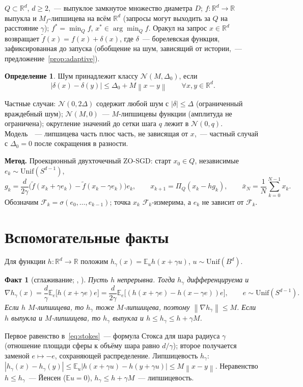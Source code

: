 \documentclass[12pt,a4paper]{article}
\theoremstyle{plain}
\newtheorem{fact}{Факт}
\theoremstyle{definition}
\newtheorem{definition}{Определение}
\theoremstyle{remark}
\newcommand{\E}{\mathbb{E}}
\newcommand{\R}{\mathbb{R}}
\newcommand{\norm}[1]{\left\lVert #1\right\rVert}
\newcommand{\abs}[1]{\left\lvert #1\right\rvert}
\newcommand{\F}{\mathcal F}
\begin{document}
$Q\subset\R^d$, $d\ge2$,~--- выпуклое замкнутое множество диаметра $D$; $f:\R^d\to\R$ выпукла и $M_f$-липшицева на всём $\R^d$ (запросы могут выходить за $Q$ на расстояние $\gamma$); $f^*=\min_Qf$, $x^*\in\arg\min_Qf$. Оракул на запрос $x\in\R^d$ возвращает $\tilde f(x)=f(x)+\delta(x)$, где $\delta$~--- борелевская функция, зафиксированная до запуска (обобщение на шум, зависящий от истории,~--- предложение~\ref{prop:adaptive}).

\begin{definition}
Шум принадлежит классу $\mathcal N(M,\Delta_0)$, если
\begin{equation}\label{eq:class}
  \abs{\delta(x)-\delta(y)}\le\Delta_0+M\norm{x-y}\qquad\forall x,y\in\R^d .
\end{equation}
\end{definition}
Частные случаи: $\mathcal N(0,2\Delta)$ содержит любой шум с $\abs\delta\le\Delta$ (ограниченный враждебный шум); $\mathcal N(M,0)$~--- $M$-липшицевы функции (амплитуда не ограничена); округление значений до сетки шага $q$ лежит в $\mathcal N(0,q)$. Модель~\cite[разд.~4]{GDN16}~--- липшицева часть плюс часть, не зависящая от $x$,~--- частный случай с $\Delta_0=0$ после сокращения в разности.

\textbf{Метод.} Проекционный двухточечный ZO-SGD: старт $x_0\in Q$, независимые $e_k\sim\mathrm{Unif}(S^{d-1})$,
\begin{equation}\label{eq:method}
  g_k=\frac d{2\gamma}\bigl(\tilde f(x_k+\gamma e_k)-\tilde f(x_k-\gamma e_k)\bigr)e_k,\qquad x_{k+1}=\Pi_Q(x_k-hg_k),\qquad\bar x_N=\frac1N\sum_{k=0}^{N-1}x_k .
\end{equation}
Обозначим $\F_k=\sigma(e_0,\dots,e_{k-1})$; точка $x_k$ $\F_k$-измерима, а $e_k$ не зависит от $\F_k$.

\section{Вспомогательные факты}

Для функции $h:\R^d\to\R$ положим $h_\gamma(x)=\E_uh(x+\gamma u)$, $u\sim\mathrm{Unif}(B^d)$.

\begin{fact}[сглаживание; {\cite[лемма~1]{FKM05}}, {\cite[теорема~1]{survey}}]\label{fact:smooth}
Пусть $h$ непрерывна. Тогда $h_\gamma$ дифференцируема и
\begin{equation}\label{eq:stokes}
  \nabla h_\gamma(x)=\frac d\gamma\E_e\bigl[h(x+\gamma e)e\bigr]=\frac d{2\gamma}\E_e\bigl[(h(x+\gamma e)-h(x-\gamma e))e\bigr],\qquad e\sim\mathrm{Unif}(S^{d-1}).
\end{equation}
Если $h$ $M$-липшицева, то $h_\gamma$ тоже $M$-липшицева, поэтому $\norm{\nabla h_\gamma}\le M$. Если $h$ выпукла и $M$-липшицева, то $h_\gamma$ выпукла и $h\le h_\gamma\le h+\gamma M$.
\end{fact}
Первое равенство в~\eqref{eq:stokes}~--- формула Стокса для шара радиуса $\gamma$ (отношение площади сферы к объёму шара равно $d/\gamma$); второе получается заменой $e\mapsto-e$, сохраняющей распределение. Липшицевость $h_\gamma$: $\abs{h_\gamma(x)-h_\gamma(y)}\le\E_u\abs{h(x+\gamma u)-h(y+\gamma u)}\le M\norm{x-y}$. Неравенство $h\le h_\gamma$~--- Йенсен ($\E u=0$), $h_\gamma\le h+\gamma M$~--- липшицевость.
\end{document}
